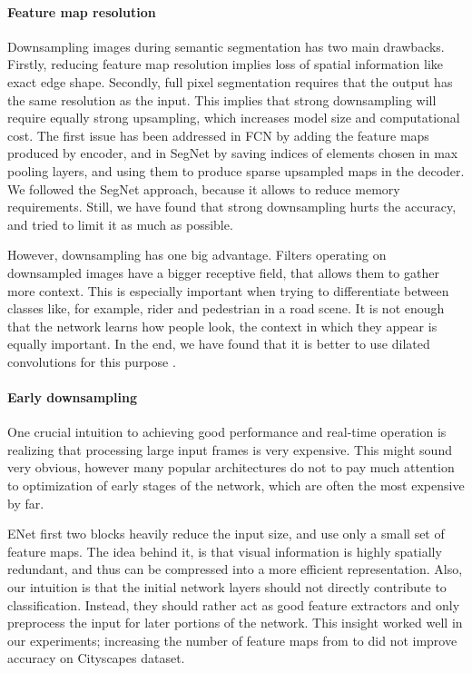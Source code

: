\documentclass{article}
\begin{document}
\paragraph{Feature map resolution}
Downsampling images during semantic segmentation has two main drawbacks.
Firstly, reducing feature map resolution implies loss of spatial information like exact edge shape.
Secondly, full pixel segmentation requires that the output has the same resolution as the input.
This implies that strong downsampling will require equally strong upsampling, which increases model size and computational cost.
The first issue has been addressed in FCN \cite{long15} by adding the feature maps produced by encoder, and in SegNet \cite{badrinarayanan15basic} by saving indices of elements chosen in max pooling layers, and using them to produce sparse upsampled maps in the decoder.
We followed the SegNet approach, because it allows to reduce memory requirements.
Still, we have found that strong downsampling hurts the accuracy, and tried to limit it as much as possible.

However, downsampling has one big advantage.
Filters operating on downsampled images have a bigger receptive field, that allows them to gather more context.
This is especially important when trying to differentiate between classes like, for example, rider and pedestrian in a road scene.
It is not enough that the network learns how people look, the context in which they appear is equally important.
In the end, we have found that it is better to use dilated convolutions for this purpose \cite{yu2015dilated}.

\paragraph{Early downsampling}
One crucial intuition to achieving good performance and real-time operation is realizing that processing large input frames is very expensive.
This might sound very obvious, however many popular architectures do not to pay much attention to optimization of early stages of the network, which are often the most expensive by far.

ENet first two blocks heavily reduce the input size, and use only a small set of feature maps.
The idea behind it, is that visual information is highly spatially redundant, and thus can be compressed into a more efficient representation.
Also, our intuition is that the initial network layers should not directly contribute to classification.
Instead, they should rather act as good feature extractors and only preprocess the input for later portions of the network.
This insight worked well in our experiments; increasing the number of feature maps from  to  did not improve accuracy on Cityscapes \cite{cityscape2016} dataset.
\end{document}

